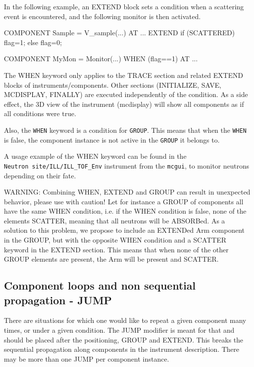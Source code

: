 In the following example, an EXTEND block sets a condition when a scattering
event is encountered, and the following monitor is then activated.
\begin{mcstas}
COMPONENT Sample = V_sample(...) AT ...
  EXTEND
    if (SCATTERED) flag=1; else flag=0;

COMPONENT MyMon = Monitor(...) WHEN (flag==1)
  AT ...
\end{mcstas}

The WHEN keyword only applies to the TRACE section and related EXTEND blocks of
instruments/components. Other sections (INITIALIZE, SAVE, MCDISPLAY, FINALLY)
are executed independently of the condition. As a side effect, the 3D view of
the instrument (mcdisplay) will show all components as if all conditions were
true.

Also, the \verb+WHEN+ keyword is a condition for \verb+GROUP+. This means that
when the \verb+WHEN+ is false, the component instance is not active in the
\verb+GROUP+ it belongs to.

A usage example of the WHEN keyword can be found in the \\
\verb+Neutron site/ILL/ILL_TOF_Env+ instrument from the \verb+mcgui+, to monitor
neutrons depending on their fate.


WARNING: Combining WHEN, EXTEND and GROUP can result in unexpected behavior,
please use with caution! Let for instance a GROUP of components all have the
same WHEN condition, i.e. if the WHEN condition is false, none of the elements
SCATTER, meaning that all neutrons will be ABSORBed.
As a solution to this
problem, we propose to include an EXTENDed Arm component in the GROUP, but with
the opposite WHEN condition and a SCATTER keyword in the EXTEND section. This
means that when none of the other GROUP elements are present, the Arm will be
present and SCATTER.


\subsection{Component loops and non sequential propagation - JUMP}
\label{s:instrdefs-extend-jump}

There are situations for which one would like to repeat a given component many
times, or under a given condition. The JUMP modifier is meant for that and
should be placed after the positioning, GROUP and EXTEND. This breaks the
sequential propagation along components in the instrument description. There may
be more than one JUMP per component instance.

